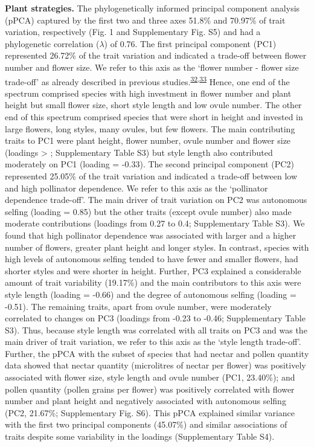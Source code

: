 \documentclass[
  12pt,
  a4paper,
]{article}
\begin{document}
\textbf{Plant strategies.} The phylogenetically informed principal component analysis (pPCA) captured by the first two and three axes 51.8\% and 70.97\% of trait variation, respectively (Fig. 1 and Supplementary Fig. S5) and had a phylogenetic correlation (\(\lambda\)) of 0.76. The first principal component (PC1) represented 26.72\% of the trait variation and indicated a trade-off between flower number and flower size. We refer to this axis as the `flower number - flower size trade-off' as already described in previous studies.\textsuperscript{\protect\hyperlink{ref-sargent2007}{32},\protect\hyperlink{ref-kettle2011}{33}} Hence, one end of the spectrum comprised species with high investment in flower number and plant height but small flower size, short style length and low ovule number. The other end of this spectrum comprised species that were short in height and invested in large flowers, long styles, many ovules, but few flowers. The main contributing traits to PC1 were plant height, flower number, ovule number and flower size (loadings \textgreater{} \textbar; Supplementary Table S3) but style length also contributed moderately on PC1 (loading = -0.33). The second principal component (PC2) represented 25.05\% of the trait variation and indicated a trade-off between low and high pollinator dependence. We refer to this axis as the `pollinator dependence trade-off'. The main driver of trait variation on PC2 was autonomous selfing (loading = 0.85) but the other traits (except ovule number) also made moderate contributions (loadings from 0.27 to 0.4; Supplementary Table S3). We found that high pollinator dependence was associated with larger and a higher number of flowers, greater plant height and longer styles. In contrast, species with high levels of autonomous selfing tended to have fewer and smaller flowers, had shorter styles and were shorter in height. Further, PC3 explained a considerable amount of trait variability (19.17\%) and the main contributors to this axis were style length (loading = -0.66) and the degree of autonomous selfing (loading = -0.51). The remaining traits, apart from ovule number, were moderately correlated to changes on PC3 (loadings from -0.23 to -0.46; Supplementary Table S3). Thus, because style length was correlated with all traits on PC3 and was the main driver of trait variation, we refer to this axis as the `style length trade-off'. Further, the pPCA with the subset of species that had nectar and pollen quantity data showed that nectar quantity (microlitres of nectar per flower) was positively associated with flower size, style length and ovule number (PC1, 23.40\%); and pollen quantity (pollen grains per flower) was positively correlated with flower number and plant height and negatively associated with autonomous selfing (PC2, 21.67\%; Supplementary Fig. S6). This pPCA explained similar variance with the first two principal components (45.07\%) and similar associations of traits despite some variability in the loadings (Supplementary Table S4).
\end{document}
